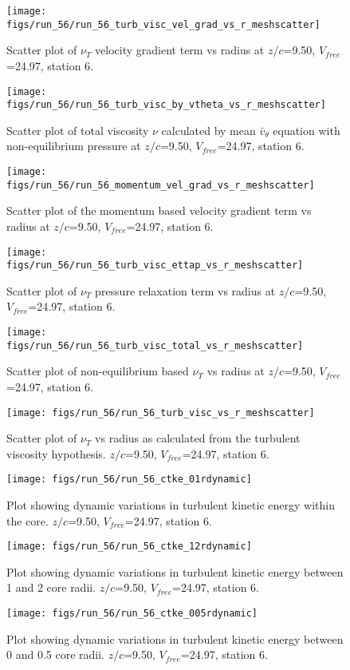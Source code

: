 \begin{figure}[H]
\centering
\texttt{[image: figs/run\_56/run\_56\_turb\_visc\_vel\_grad\_vs\_r\_meshscatter]}
\caption{Scatter plot of $\nu_T$ velocity gradient term vs radius at $z/c$=9.50, $V_{free}$=24.97, station 6.}
\end{figure}


\begin{figure}[H]
\centering
\texttt{[image: figs/run\_56/run\_56\_turb\_visc\_by\_vtheta\_vs\_r\_meshscatter]}
\caption{Scatter plot of total viscosity $\nu$ calculated by mean $\bar{v}_{\theta}$ equation with non-equilibrium pressure at $z/c$=9.50, $V_{free}$=24.97, station 6.}
\end{figure}


\begin{figure}[H]
\centering
\texttt{[image: figs/run\_56/run\_56\_momentum\_vel\_grad\_vs\_r\_meshscatter]}
\caption{Scatter plot of the momentum based velocity gradient term vs radius at $z/c$=9.50, $V_{free}$=24.97, station 6.}
\end{figure}


\begin{figure}[H]
\centering
\texttt{[image: figs/run\_56/run\_56\_turb\_visc\_ettap\_vs\_r\_meshscatter]}
\caption{Scatter plot of $\nu_T$ pressure relaxation term vs radius at $z/c$=9.50, $V_{free}$=24.97, station 6.}
\end{figure}


\begin{figure}[H]
\centering
\texttt{[image: figs/run\_56/run\_56\_turb\_visc\_total\_vs\_r\_meshscatter]}
\caption{Scatter plot of non-equilibrium based $\nu_T$ vs radius at $z/c$=9.50, $V_{free}$=24.97, station 6.}
\end{figure}


\begin{figure}[H]
\centering
\texttt{[image: figs/run\_56/run\_56\_turb\_visc\_vs\_r\_meshscatter]}
\caption{Scatter plot of $\nu_T$ vs radius as calculated from the turbulent viscosity hypothesis. $z/c$=9.50, $V_{free}$=24.97, station 6.}
\end{figure}


\begin{figure}[H]
\centering
\texttt{[image: figs/run\_56/run\_56\_ctke\_01rdynamic]}
\caption{Plot showing dynamic variations in turbulent kinetic energy within the core. $z/c$=9.50, $V_{free}$=24.97, station 6.}
\end{figure}


\begin{figure}[H]
\centering
\texttt{[image: figs/run\_56/run\_56\_ctke\_12rdynamic]}
\caption{Plot showing dynamic variations in turbulent kinetic energy between 1 and 2 core radii. $z/c$=9.50, $V_{free}$=24.97, station 6.}
\end{figure}


\begin{figure}[H]
\centering
\texttt{[image: figs/run\_56/run\_56\_ctke\_005rdynamic]}
\caption{Plot showing dynamic variations in turbulent kinetic energy between 0 and 0.5 core radii. $z/c$=9.50, $V_{free}$=24.97, station 6.}
\end{figure}


